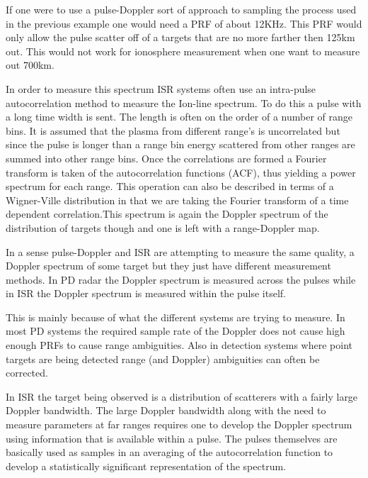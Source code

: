 
If one were to use a pulse-Doppler sort of approach to sampling the process used in the previous example one would need a PRF of about 12KHz.  This PRF would only allow the pulse scatter off of a targets that are no more farther then 125km out.  This would not work for ionosphere measurement when one want to measure out 700km. 

In order to measure this spectrum ISR systems often use an intra-pulse autocorrelation method to measure the Ion-line spectrum.  To do this a pulse with a long time width is sent.  The length is often on the order of a number of range bins.  It is assumed that the plasma from different range's is uncorrelated but since the pulse is longer than a range bin energy scattered from other ranges are summed into other range bins.  Once the correlations are formed a Fourier transform is taken of the autocorrelation functions (ACF), thus yielding a power spectrum for each range.  This operation can also be described in terms of a Wigner-Ville distribution in that we are taking the Fourier transform of a time dependent correlation.\footnotemark[2] This spectrum is again the Doppler spectrum of the distribution of targets though and one is left with a range-Doppler map.

In a sense pulse-Doppler and ISR are attempting to measure the same quality, a Doppler spectrum of some target but they just have different measurement methods.  In PD radar the Doppler spectrum is measured across the pulses while in ISR the Doppler spectrum is measured within the pulse itself.  

This is mainly because of what the different systems are trying to measure.  In most PD systems the required sample rate of the Doppler does not cause high enough PRFs to cause range ambiguities.  Also in detection systems where point targets are being detected range (and Doppler) ambiguities can often be corrected.

In ISR the target being observed is a distribution of scatterers with a fairly large Doppler bandwidth.  The large Doppler bandwidth along with the need to measure parameters at far ranges requires one to develop the Doppler spectrum using information that is available within a pulse.  The pulses themselves are basically used as samples in an averaging of the autocorrelation function to develop a statistically significant representation of the spectrum.


